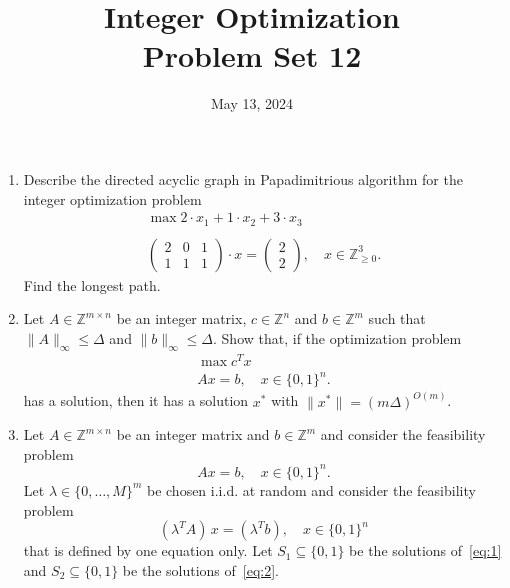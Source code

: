 \documentclass[11pt,a4paper]{article}
\title{Integer Optimization  \\ Problem Set 12 }
\date{ May 13, 2024}
\begin{document}
\maketitle 


\begin{enumerate}
\item Describe the directed acyclic graph in Papadimitrious algorithm for the integer optimization problem
  \begin{displaymath}
    \begin{array}{c}
      \max 2 ⋅x_1 + 1 ⋅ x_2 + 3 ⋅x_3 \\ \\ 
      \begin{pmatrix}
        2 & 0 & 1\\
        1 & 1 & 1
      \end{pmatrix} ⋅x =
                \begin{pmatrix}
                  2 \\ 2
                \end{pmatrix}, \quad  x ∈ℤ_{≥0}^3. 
    \end{array}
  \end{displaymath}
  Find the longest path. 
\item Let $A ∈ ℤ^{ m ×n}$ be an integer matrix, $c ∈ ℤ^n$  and $b ∈ ℤ^m$ such that $\|A\|_∞ ≤ Δ$ and $\|b\|_∞ ≤ Δ$. Show that, if the optimization problem 
  \begin{displaymath}    
    \begin{array}{c}
      \max c^Tx \\ 
      Ax = b, \quad x ∈ \{0,1\}^n.      
    \end{array}
  \end{displaymath}
  has a solution, then it has a solution $x^*$ with $\|x^*\| = (mΔ)^{O(m)}$.
\item Let $A ∈ ℤ^{ m ×n}$ be an integer matrix and $b ∈ ℤ^m$ and consider the feasibility problem 
  \begin{equation}
    \label{eq:1}
    Ax = b, \quad x ∈ \{0,1\}^n.  
  \end{equation}
  Let $λ ∈ \{0,\dots,M\}^m$ be chosen i.i.d. at random and consider the feasibility problem 
  \begin{equation}
    \label{eq:2}
    (λ^TA)\,  x = (λ^Tb), \quad x ∈ \{0,1\}^n 
  \end{equation}
  that is defined by one equation only. Let $S_1 ⊆ \{0,1\}$ be the solutions of~\eqref{eq:1} and $S_2 ⊆ \{0,1\}$ be the solutions of~\eqref{eq:2}.
  \begin{enumerate}

\end{enumerate}
\end{enumerate}
\end{document}
